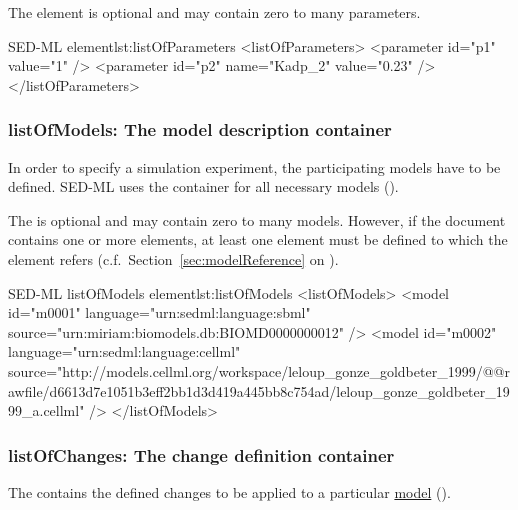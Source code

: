 
The element is optional and may contain zero to many parameters.

\begin{myXmlLst}{SED-ML  element}{lst:listOfParameters}
<listOfParameters>
 <parameter id="p1" value="1" />
 <parameter id="p2" name="Kadp_2" value="0.23" />
</listOfParameters>
\end{myXmlLst}


\subsubsection{listOfModels: The model description container}
\label{sec:listOfModels}
In order to specify a simulation experiment, the participating models have to be defined. SED-ML uses the  container for all necessary models (). 


The  is optional and may contain zero to many models. However, if the \currentLV document contains  one or more  elements, at least one  element must be defined to which the  element refers (c.f.\ Section~\ref{sec:modelReference} on ).

\begin{myXmlLst}{SED-ML listOfModels element}{lst:listOfModels}
<listOfModels>
 <model id="m0001" language="urn:sedml:language:sbml" 
  source="urn:miriam:biomodels.db:BIOMD0000000012" />
 <model id="m0002" language="urn:sedml:language:cellml" 
  source="http://models.cellml.org/workspace/leloup_gonze_goldbeter_1999/@@rawfile/d6613d7e1051b3eff2bb1d3d419a445bb8c754ad/leloup_gonze_goldbeter_1999_a.cellml" />
</listOfModels>
\end{myXmlLst}


\subsubsection{listOfChanges: The change definition container}
\label{sec:listOfChanges}
The  contains the defined changes to be applied to a particular \hyperref[class:model]{model} (). 

